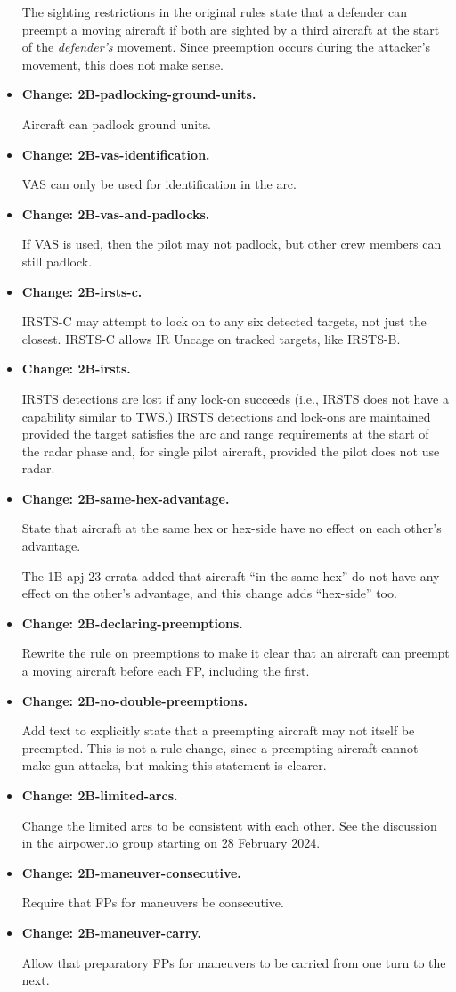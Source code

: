 \documentclass[10pt]{report}
\newcommand{\itemtag}[1]{\item \textbf{Change: #1.}\par}
\begin{document}
\begin{itemize}
    The sighting restrictions in the original rules state that a defender can preempt a moving aircraft if both are sighted by a third aircraft at the start of the \emph{defender's} movement. Since preemption occurs during the attacker's movement, this does not make sense.

    \itemtag{2B-padlocking-ground-units} Aircraft can padlock ground units.

    \itemtag{2B-vas-identification} VAS can only be used for identification in the  arc.
    
    \itemtag{2B-vas-and-padlocks} If VAS is used, then the pilot may not padlock, but other crew members can still padlock.

    \itemtag{2B-irsts-c} IRSTS-C may attempt to lock on to any six detected targets, not just the closest. IRSTS-C allows IR Uncage on tracked targets, like IRSTS-B.
    
    \itemtag{2B-irsts} IRSTS detections are lost if any lock-on succeeds (i.e., IRSTS does not have a capability similar to TWS.) IRSTS detections and lock-ons are maintained provided the target satisfies the arc and range requirements at the start of the radar phase and, for single pilot aircraft, provided the pilot does not use radar.

    \itemtag{2B-same-hex-advantage} State that aircraft at the same hex or hex-side have no effect on each other's advantage.  
    
    The 1B-apj-23-errata added that aircraft “in the same hex” do not have any effect on the other's advantage, and this change adds “hex-side” too.
    
    \itemtag{2B-declaring-preemptions} Rewrite the rule on preemptions to make it clear that an aircraft can preempt a moving aircraft before each FP, including the first.

    \itemtag{2B-no-double-preemptions} Add text to explicitly state that a preempting aircraft may not itself be preempted. This is not a rule change, since a preempting aircraft cannot make gun attacks, but making this statement is clearer.

    \itemtag{2B-limited-arcs} Change the limited arcs to be consistent with each other. See the discussion in the airpower.io group starting on 28 February 2024.

    \itemtag{2B-maneuver-consecutive} Require that FPs for maneuvers be consecutive.

    \itemtag{2B-maneuver-carry} Allow that preparatory FPs for maneuvers to be carried from one turn to the next.
    

\end{itemize}
\end{document}
